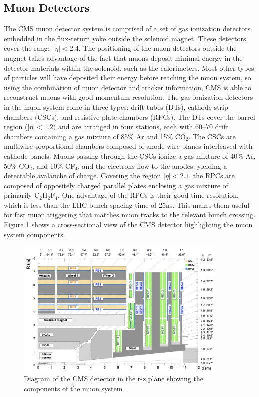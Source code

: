\subsection{Muon Detectors}
The CMS muon detector system is comprised of a set of gas ionization detectors embedded in the flux-return yoke outside the solenoid magnet. 
These detectors cover the range $|\eta| < 2.4$. The positioning of the muon detectors outside the magnet takes advantage of the fact that muons deposit minimal energy in the detector 
materials within the solenoid, such as the calorimeters. Most other types of particles will have deposited their energy before reaching the muon system, so using the combination of muon detector and tracker information, CMS is able to reconstruct muons with good momentum resolution. The gas ionization detectors in the muon system come in three types: drift tubes (DTs), cathode strip chambers (CSCs), and 
resistive plate chambers (RPCs). The DTs cover the barrel region ($|\eta| < 1.2$) and are arranged in four stations, each with 60--70 drift chambers containing a gas mixture of 85\% Ar and 15\% CO$_2$.
The CSCs are multiwire proportional chambers composed of anode wire planes interleaved with cathode panels. Muons passing through the CSCs ionize a gas mixture of 40\% Ar, 50\% CO$_2$, and 10\% CF$_4$, 
and the electrons flow to the anodes, yielding a detectable avalanche of charge. Covering the region $|\eta| < 2.1$, the RPCs are composed of oppositely charged parallel plates enclosing a gas mixture 
of primarily $\mathrm{C}_2\mathrm{H}_2\mathrm{F}_4$. One advantage of the RPCs is their good time resolution, which is less than the LHC bunch spacing time of 25ns. This makes them useful for fast muon triggering that matches
muon tracks to the relevant bunch crossing. Figure \ref{fig:muon_system} shows a cross-sectional view of the CMS detector highlighting the muon system components. 

\begin{figure}[tb]
  \centering
   \includegraphics[width=0.9\textwidth]{fig/experiment/detector/muon_sys_r-z.png}
	\caption[Diagram of the CMS detector in the r-z plane showing the components of the muon system.]
	{Diagram of the CMS detector in the r-z plane showing the components of the muon system~\cite{CMS:2008xjf}.}
	\label{fig:muon_system}
\end{figure}

